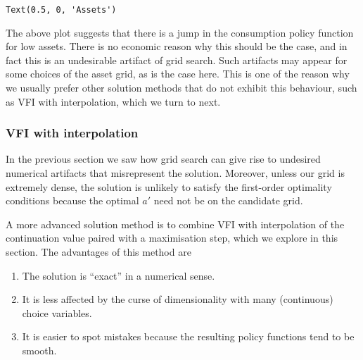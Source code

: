 \documentclass{scrartcl}
\makeatletter
\providecommand{\tightlist}{%
      \setlength{\itemsep}{0pt}\setlength{\parskip}{0pt}}
\newcommand{\boxspacing}{\kern\kvtcb@left@rule\kern\kvtcb@boxsep}
\newcommand{\prompt}[4]{
        {\ttfamily\llap{{\color{#2}[#3]:\hspace{3pt}#4}}\vspace{-\baselineskip}}
    }
\makeatother
\begin{document}
            \begin{tcolorbox}[breakable, size=fbox, boxrule=.5pt, pad at break*=1mm, opacityfill=0]
\prompt{Out}{outcolor}{7}{\boxspacing}
\begin{Verbatim}[commandchars=\\\{\}]
Text(0.5, 0, 'Assets')
\end{Verbatim}
\end{tcolorbox}
        
    \begin{center}
    \end{center}
    
    The above plot suggests that there is a jump in the consumption policy
function for low assets. There is no economic reason why this should be
the case, and in fact this is an undesirable artifact of grid search.
Such artifacts may appear for some choices of the asset grid, as is the
case here. This is one of the reason why we usually prefer other
solution methods that do not exhibit this behaviour, such as VFI with
interpolation, which we turn to next.

    \hypertarget{vfi-with-interpolation}{%
\subsubsection{VFI with interpolation}\label{vfi-with-interpolation}}

In the previous section we saw how grid search can give rise to
undesired numerical artifacts that misrepresent the solution. Moreover,
unless our grid is extremely dense, the solution is unlikely to satisfy
the first-order optimality conditions because the optimal \(a'\) need
not be on the candidate grid.

A more advanced solution method is to combine VFI with interpolation of
the continuation value paired with a maximisation step, which we explore
in this section. The advantages of this method are

\begin{enumerate}
\def\labelenumi{\arabic{enumi}.}
\tightlist
\item
  The solution is ``exact'' in a numerical sense.
\item
  It is less affected by the curse of dimensionality with many
  (continuous) choice variables.
\item
  It is easier to spot mistakes because the resulting policy functions
  tend to be smooth.
\end{enumerate}
\end{document}
